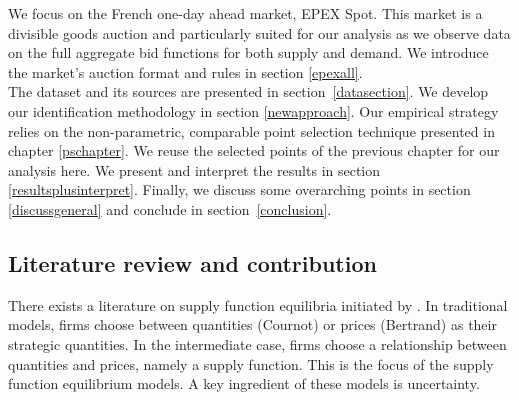 We focus on the French one-day ahead market, EPEX Spot. This market is a divisible goods auction and 
particularly suited for our analysis as we observe data on the full aggregate bid functions for both supply and demand.  We introduce the market's auction format and rules in section \ref{epexall}.\\
The dataset and its sources are presented in section~\ref{datasection}.
We develop our identification methodology in section \ref{newapproach}. Our empirical strategy relies on the non-parametric, comparable point selection technique presented in chapter \ref{pschapter}. 
We reuse the selected points of the previous chapter for our analysis here. 
We present and interpret the results in section \ref{resultsplusinterpret}. 
Finally, we discuss some overarching points in section \ref{discussgeneral} and conclude in section~\ref{conclusion}.


\subsection{Literature review and contribution}
\label{litrev}

There exists a literature on supply function equilibria initiated by \cite{KM}. 
In traditional models, firms choose between quantities (Cournot) or prices (Bertrand) as their strategic quantities. In the intermediate case, firms choose a relationship between quantities and prices, namely a supply function. This is the focus of the supply function equilibrium models.
A key ingredient of these models is uncertainty.\\


